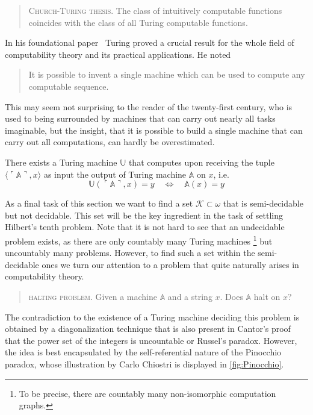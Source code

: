 \begin{quote}
  \textsc{Church-Turing thesis.} The class of intuitively computable
  functions coincides with the class of all Turing computable functions.
\end{quote}

In his foundational paper~\cite{Turing1936} Turing proved a crucial result for
the whole field of computability theory and its practical applications. He noted
\begin{quote}
  It is possible to invent a single machine which can be used to compute any
  computable sequence.
\end{quote}
This may seem not surprising to the reader of the twenty-first century, who is
used to being surrounded by machines that can carry out nearly all tasks
imaginable, but the insight, that it is possible to build a single machine that
can carry out all computations, can hardly be overestimated.

\begin{thm}
    There exists a Turing machine \(\mathbb U\) that computes upon receiving
    the tuple \(⟨\ulcorner \mathbb A \urcorner, x⟩\) as input the output of
    Turing machine \(\mathbb A\) on \(x\), i.e.
    \[
      \mathbb U(\ulcorner \mathbb A \urcorner, x) = y \quad ⇔ \quad
        \mathbb A (x) = y
    \]
\end{thm}

As a final task of this section we want to find a set \(\mathcal{K} ⊂ ω\) that
is semi-decidable but not decidable. This set will be the key ingredient in the
task of settling Hilbert's tenth problem. Note that it is not hard to see that
an undecidable problem exists, as there are only countably many Turing machines%
\footnote{To be precise, there are countably many non-isomorphic computation
graphs.} but uncountably many problems. However, to find such a set within the
semi-decidable ones we turn our attention to a problem that quite naturally
arises in computability theory.
\begin{quote}
  \textsc{halting problem.} Given a machine \(\mathbb A\) and a string \(x\).
  Does \(\mathbb A\) halt on \(x\)?
\end{quote}
The contradiction to the existence of a Turing machine deciding this problem is
obtained by a diagonalization technique that is also present in Cantor's proof
that the power set of the integers is uncountable or Russel's paradox. However,
the idea is best encapsulated by the self-referential nature of the Pinocchio
paradox, whose illustration by Carlo Chiostri is displayed in
\cref{fig:Pinocchio}.

